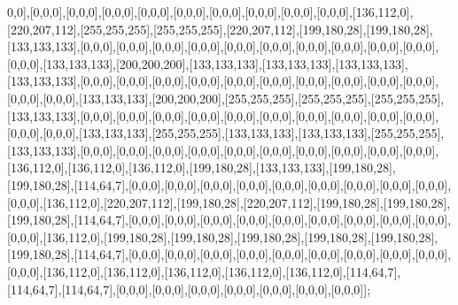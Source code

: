 0,0],[0,0,0],[0,0,0],[0,0,0],[0,0,0],[0,0,0],[0,0,0],[0,0,0],[0,0,0],[0,0,0],[136,112,0],[220,207,112],[255,255,255],[255,255,255],[220,207,112],[199,180,28],[199,180,28],[133,133,133],[0,0,0],[0,0,0],[0,0,0],[0,0,0],[0,0,0],[0,0,0],[0,0,0],[0,0,0],[0,0,0],[0,0,0],[0,0,0],[133,133,133],[200,200,200],[133,133,133],[133,133,133],[133,133,133],[133,133,133],[0,0,0],[0,0,0],[0,0,0],[0,0,0],[0,0,0],[0,0,0],[0,0,0],[0,0,0],[0,0,0],[0,0,0],[0,0,0],[0,0,0],[133,133,133],[200,200,200],[255,255,255],[255,255,255],[255,255,255],[133,133,133],[0,0,0],[0,0,0],[0,0,0],[0,0,0],[0,0,0],[0,0,0],[0,0,0],[0,0,0],[0,0,0],[0,0,0],[0,0,0],[0,0,0],[133,133,133],[255,255,255],[133,133,133],[133,133,133],[255,255,255],[133,133,133],[0,0,0],[0,0,0],[0,0,0],[0,0,0],[0,0,0],[0,0,0],[0,0,0],[0,0,0],[0,0,0],[0,0,0],[136,112,0],[136,112,0],[136,112,0],[199,180,28],[133,133,133],[199,180,28],[199,180,28],[114,64,7],[0,0,0],[0,0,0],[0,0,0],[0,0,0],[0,0,0],[0,0,0],[0,0,0],[0,0,0],[0,0,0],[0,0,0],[136,112,0],[220,207,112],[199,180,28],[220,207,112],[199,180,28],[199,180,28],[199,180,28],[114,64,7],[0,0,0],[0,0,0],[0,0,0],[0,0,0],[0,0,0],[0,0,0],[0,0,0],[0,0,0],[0,0,0],[0,0,0],[136,112,0],[199,180,28],[199,180,28],[199,180,28],[199,180,28],[199,180,28],[199,180,28],[114,64,7],[0,0,0],[0,0,0],[0,0,0],[0,0,0],[0,0,0],[0,0,0],[0,0,0],[0,0,0],[0,0,0],[0,0,0],[136,112,0],[136,112,0],[136,112,0],[136,112,0],[136,112,0],[114,64,7],[114,64,7],[114,64,7],[0,0,0],[0,0,0],[0,0,0],[0,0,0],[0,0,0],[0,0,0],[0,0,0]];

